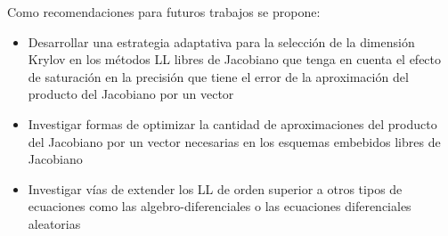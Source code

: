\begin{recomendations}

Como recomendaciones para futuros trabajos se propone:
\begin{itemize}
	\item Desarrollar una estrategia adaptativa para la selección de la dimensión Krylov en los métodos LL libres de Jacobiano que tenga en cuenta el efecto de saturación en la precisión que tiene el error de la aproximación del producto del Jacobiano por un vector
	\item Investigar formas de optimizar la cantidad de aproximaciones del producto del Jacobiano por un vector necesarias en los esquemas embebidos libres de Jacobiano
	\item Investigar vías de extender los LL de orden superior a otros tipos de ecuaciones como las algebro-diferenciales o las ecuaciones diferenciales aleatorias
\end{itemize}

\end{recomendations}
